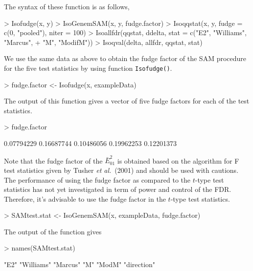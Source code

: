 \documentclass[10pt]{mybook4}
\begin{document}
The syntax of these function is as follows,

\begin{Schunk}
\begin{Sinput}
> Isofudge(x, y)
> IsoGenemSAM(x, y, fudge.factor)
> Isoqqstat(x, y, fudge = c(0, "pooled"), niter = 100)
> Isoallfdr(qqstat, ddelta, stat = c("E2", "Williams", "Marcus", 
+     "M", "ModifM"))
> Isoqval(delta, allfdr, qqstat, stat)
\end{Sinput}
\end{Schunk}

We use the same data as above to obtain the fudge factor of the SAM procedure for
the five test statistics by using function \texttt{Isofudge()}.

\begin{Schunk}
\begin{Sinput}
> fudge.factor <- Isofudge(x, exampleData)
\end{Sinput}
\end{Schunk}

The output of this function gives a vector of five fudge factors for each of the test statistics.

\begin{Schunk}
\begin{Sinput}
> fudge.factor
\end{Sinput}
\begin{Soutput}
[1] 0.07794229 0.16687744 0.10486056 0.19962253 0.12201373
\end{Soutput}
\end{Schunk}

Note that the fudge factor of the $\bar{E}_{01}^2$ is obtained based on the algorithm for F test
statistics given by Tusher \textit{et al.}\ (2001) and should be used with cautions. The performance of using
the fudge factor as compared to the $t$-type test statistics has not yet investigated in term of
power and control of the FDR. Therefore, it's advisable to use the fudge factor in the $t$-type test statistics.

\begin{Schunk}
\begin{Sinput}
> SAMtest.stat <- IsoGenemSAM(x, exampleData, fudge.factor)
\end{Sinput}
\end{Schunk}

The output of the function gives

\begin{Schunk}
\begin{Sinput}
> names(SAMtest.stat)
\end{Sinput}
\begin{Soutput}
[1] "E2"        "Williams"  "Marcus"    "M"         "ModM"      "direction"
\end{Soutput}
\end{Schunk}
\end{document}

